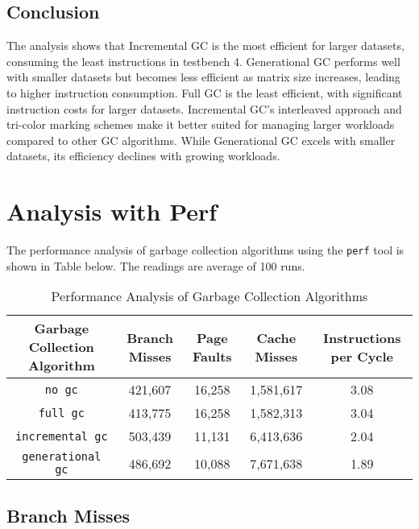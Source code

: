 \documentclass[10pt]{article}
\begin{document}
\subsection{Conclusion}
The analysis shows that Incremental GC is the most efficient for larger datasets, consuming the least instructions in testbench 4. Generational GC performs well with smaller datasets but becomes less efficient as matrix size increases, leading to higher instruction consumption. Full GC is the least efficient, with significant instruction costs for larger datasets. Incremental GC's interleaved approach and tri-color marking schemes make it better suited for managing larger workloads compared to other GC algorithms. While Generational GC excels with smaller datasets, its efficiency declines with growing workloads.


\section{Analysis with Perf}
The performance analysis of garbage collection algorithms using the \texttt{perf} tool is shown in Table below. The readings are average of 100 runs.

\begin{table}[H]
  \centering
  \begin{tabular}{|c|c|c|c|c|}
      \hline
      \textbf{Garbage Collection Algorithm} & \textbf{Branch Misses} & \textbf{Page Faults} & \textbf{Cache Misses} & \textbf{Instructions per Cycle} \\
      \hline
      \texttt{no gc} & 421,607 & 16,258 & 1,581,617 & 3.08 \\
      \texttt{full gc} & 413,775 & 16,258 & 1,582,313 & 3.04 \\
      \texttt{incremental gc} & 503,439 & 11,131 & 6,413,636 & 2.04 \\
      \texttt{generational gc} & 486,692 & 10,088 & 7,671,638 & 1.89 \\
      \hline
  \end{tabular}
  \caption{Performance Analysis of Garbage Collection Algorithms}
  \label{tab:performance_analysis_gc}
\end{table}


\subsection{Branch Misses}
\end{document}
